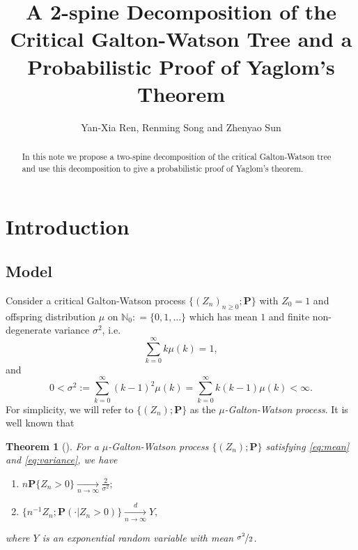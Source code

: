 \documentclass[12pt,a4paper]{amsart}
\title[A 2-spine decomposition and Yaglom's theorem]
{\large A 2-spine Decomposition of the Critical Galton-Watson Tree and a Probabilistic Proof of Yaglom's Theorem}
\author{Yan-Xia Ren, Renming Song and Zhenyao Sun}
\newtheorem{thm}{Theorem}[section]
\numberwithin{equation}{section}
\begin{document}
\begin{abstract}
	In this note  we propose a two-spine decomposition of the critical Galton-Watson tree and use this decomposition to give a probabilistic proof of Yaglom's theorem.
\end{abstract}
\maketitle	
\section{Introduction}
\subsection{Model}
\label{sec:model}
	Consider a critical Galton-Watson process $\{(Z_n)_{n\ge 0}; \mathbf P \}$ with $Z_0 = 1$ and offspring distribution $\mu$ on $\mathbb N_0 : = \{0,1,\dots\}$ which has mean $1$ and finite non-degenerate variance $\sigma^2$, i.e.
\begin{equation}\label{eq:mean}
	\sum_{k=0}^\infty k \mu(k)
	=1,
\end{equation}
	and
\begin{equation}\label{eq:variance}
	0	
	<	\sigma^2
	:=	\sum_{k=0}^\infty  (k-1)^2 \mu(k)
	=	\sum_{k=0}^\infty k(k-1) \mu(k)
	<	\infty.
\end{equation}
	For simplicity, we will refer to $\{(Z_n); \mathbf P\}$ as the \emph{$\mu$-Galton-Watson process}. 
	It is well known that
\begin{thm}[\cite{kesten1966galton}] \label{thm: Kolmogrov and Yaglom theorem}
	For a $\mu$-Galton-Watson process $\{(Z_n); \mathbf P\}$ satisfying \eqref{eq:mean} and \eqref{eq:variance}, we have
\begin{enumerate}
\item \label{thm:kolmogorov}
	$n \mathbf P \{Z_n>0\} \xrightarrow[n \to \infty]{} \frac{2}{\sigma^2};$ 
\item \label{thm:yaglom}
	$\{n^{-1}Z_n; \mathbf P(\cdot | Z_n>0)\}\xrightarrow[n \to \infty]{d} Y,$
\end{enumerate}
	where $Y$ is an exponential random variable with mean $\nicefrac{\sigma^2}{2}$.
\end{thm}
\end{document}
